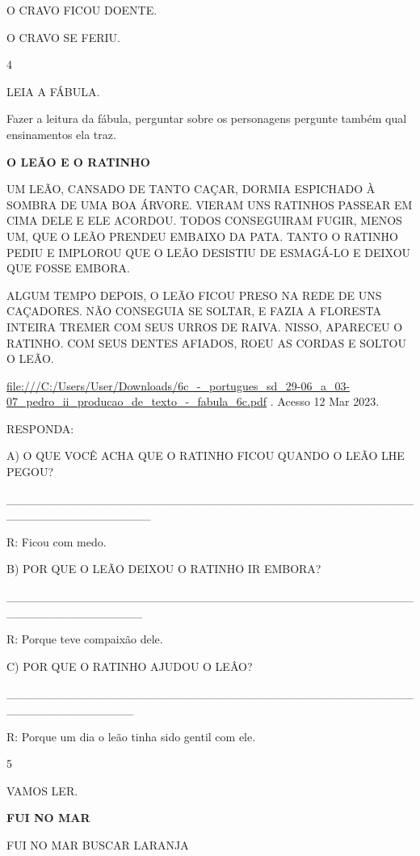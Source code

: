 {{O CRAVO FICOU DOENTE.

O CRAVO SE FERIU.

\num{4}

LEIA A FÁBULA.

Fazer a leitura da fábula, perguntar sobre os personagens pergunte
também qual ensinamentos ela traz.

\textbf{O LEÃO E O RATINHO}

UM LEÃO, CANSADO DE TANTO CAÇAR, DORMIA ESPICHADO À SOMBRA DE UMA BOA
ÁRVORE. VIERAM UNS RATINHOS PASSEAR EM CIMA DELE E ELE ACORDOU. TODOS
CONSEGUIRAM FUGIR, MENOS UM, QUE O LEÃO PRENDEU EMBAIXO DA PATA. TANTO O
RATINHO PEDIU E IMPLOROU QUE O LEÃO DESISTIU DE ESMAGÁ-LO E DEIXOU QUE
FOSSE EMBORA.

ALGUM TEMPO DEPOIS, O LEÃO FICOU PRESO NA REDE DE UNS CAÇADORES. NÃO
CONSEGUIA SE SOLTAR, E FAZIA A FLORESTA INTEIRA TREMER COM SEUS URROS DE
RAIVA. NISSO, APARECEU O RATINHO. COM SEUS DENTES AFIADOS, ROEU AS
CORDAS E SOLTOU O LEÃO.

\url{file:///C:/Users/User/Downloads/6c_-_portugues_sd_29-06_a_03-07_pedro_ii_producao_de_texto_-_fabula_6c.pdf}
. Acesso 12 Mar 2023.

RESPONDA:

A) O QUE VOCÊ ACHA QUE O RATINHO FICOU QUANDO O LEÃO LHE PEGOU?

\_\_\_\_\_\_\_\_\_\_\_\_\_\_\_\_\_\_\_\_\_\_\_\_\_\_\_\_\_\_\_\_\_\_\_\_\_\_\_\_\_\_\_\_\_\_\_\_\_\_\_\_\_\_\_\_\_\_\_\_\_\_\_\_\_

R: Ficou com medo.

B) POR QUE O LEÃO DEIXOU O RATINHO IR EMBORA?

\_\_\_\_\_\_\_\_\_\_\_\_\_\_\_\_\_\_\_\_\_\_\_\_\_\_\_\_\_\_\_\_\_\_\_\_\_\_\_\_\_\_\_\_\_\_\_\_\_\_\_\_\_\_\_\_\_\_\_\_\_\_\_\_

R: Porque teve compaixão dele.

C) POR QUE O RATINHO AJUDOU O LEÂO?

\_\_\_\_\_\_\_\_\_\_\_\_\_\_\_\_\_\_\_\_\_\_\_\_\_\_\_\_\_\_\_\_\_\_\_\_\_\_\_\_\_\_\_\_\_\_\_\_\_\_\_\_\_\_\_\_\_\_\_\_\_\_\_

R: Porque um dia o leão tinha sido gentil com ele.

\protect\hypertarget{_heading=h.cx2waide4olu}{}{}

\num{5}

VAMOS LER.

\textbf{FUI NO MAR}

FUI NO MAR BUSCAR LARANJA

}}
